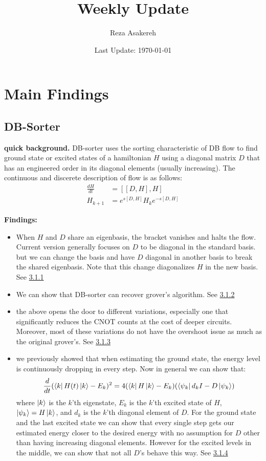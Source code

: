\documentclass[11pt]{article}
\title{Weekly Update}
\author{Reza Asakereh}
\date{Last Update: \today}
\begin{document}
\maketitle

\section{Main Findings}
\subsection{DB-Sorter}
\textbf{quick background.} DB-sorter uses the sorting characteristic of DB flow to find ground state or excited states of a hamiltonian $H$ using a diagonal matrix $D$ that has an engineered order in its diagonal elements (usually increasing). The continuous and discerete description of flow is as follows:
\begin{align}
    \frac{dH}{dt} &= [[D, H], H] \\
    H_{k+1} &= e^{s[D, H]} H_k e^{-s[D, H]}
\end{align}

\textbf{Findings:}

\begin{itemize}
    \item When $H$ and $D$ share an eigenbasis, the bracket vanishes and halts the flow. Current version generally focuses on $D$ to be diagonal in the standard basis. but we can change the basis and have $D$ diagonal in another basis to break the shared eigenbasis. Note that this change diagonalizes $H$ in the new basis. See \hyperref[sec:shared-basis]{3.1.1}
    \item We can show that DB-sorter can recover grover's algorithm. See \hyperref[sec:grover-recovery]{3.1.2}
    \item the above opens the door to different variations, especially one that significantly reduces the CNOT counts at the cost of deeper circuits. Moreover, most of these variations do not have the overshoot issue as much as the original grover's. See \hyperref[sec:grover-improvement]{3.1.3}
    \item we previously showed that when estimating the ground state, the energy level is continuously dropping in every step. Now in general we can show that:
    $$
    \frac{d}{dt}(\bra{k} H(t) \ket{k} - E_k)^2 = 4(\bra{k} H \ket{k} - E_k)(\bra{\psi_k} d_kI - D \ket{\psi_k})
    $$
    where $\ket{k}$ is the $k$'th eigenstate, $E_k$ is the $k$'th excited state of $H$, $\ket{\psi_k} = H\ket{k}$, and $d_k$ is the $k$'th diagonal element of $D$. For the ground state and the last excited state we can show that every single step gets our estimated energy closer to the desired energy with no assumption for $D$ other than having increasing diagonal elements. However for the excited levels in the middle, we can show that not all $D$'s behave this way. See \hyperref[sec:mean-squared-error]{3.1.4}
\end{itemize}
\end{document}
